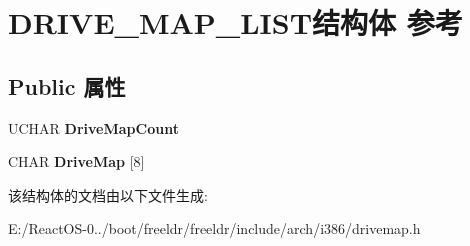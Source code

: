 \hypertarget{struct_d_r_i_v_e___m_a_p___l_i_s_t}{}\section{D\+R\+I\+V\+E\+\_\+\+M\+A\+P\+\_\+\+L\+I\+S\+T结构体 参考}
\label{struct_d_r_i_v_e___m_a_p___l_i_s_t}
\subsection*{Public 属性}
\begin{DoxyCompactItemize}
\item 
\mbox{\label{struct_d_r_i_v_e___m_a_p___l_i_s_t_acfe0cecd0277c9827c3342f1ab20bea6}} 
U\+C\+H\+AR {\bfseries Drive\+Map\+Count}
\item 
\mbox{\label{struct_d_r_i_v_e___m_a_p___l_i_s_t_a7e4bd95927c2e332301d7c02266ad6ac}} 
C\+H\+AR {\bfseries Drive\+Map} \mbox{[}8\mbox{]}
\end{DoxyCompactItemize}


该结构体的文档由以下文件生成\+:\begin{DoxyCompactItemize}
\item 
E\+:/\+React\+O\+S-\/0../boot/freeldr/freeldr/include/arch/i386/drivemap.\+h\end{DoxyCompactItemize}
